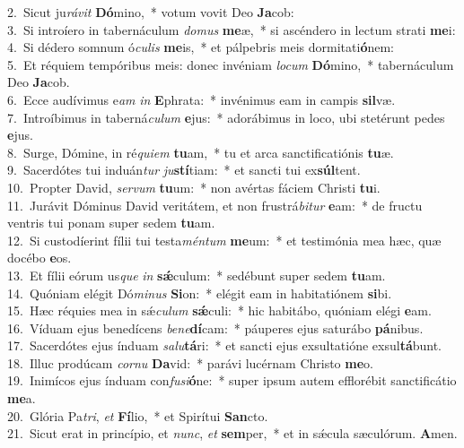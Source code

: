 {2.~}Sicut ju\textit{rá}\textit{vit} \textbf{Dó}mino,~* votum vovit Deo \textbf{Ja}cob:\\
{3.~}Si introíero in tabernáculum \textit{do}\textit{mus} \textbf{me}æ,~* si ascéndero in lectum strati \textbf{me}i:\\
{4.~}Si dédero somnum ó\textit{cu}\textit{lis} \textbf{me}is,~* et pálpebris meis dormitati\textbf{ó}nem:\\
{5.~}Et réquiem tempóribus meis: donec invéniam \textit{lo}\textit{cum} \textbf{Dó}mino,~* tabernáculum Deo \textbf{Ja}cob.\\
{6.~}Ecce audívimus e\textit{am} \textit{in} \textbf{E}phrata:~* invénimus eam in campis \textbf{sil}væ.\\
{7.~}Introíbimus in taberná\textit{cu}\textit{lum} \textbf{e}jus:~* adorábimus in loco, ubi stetérunt pedes \textbf{e}jus.\\
{8.~}Surge, Dómine, in ré\textit{qui}\textit{em} \textbf{tu}am,~* tu et arca sanctificatiónis \textbf{tu}æ.\\
{9.~}Sacerdótes tui induán\textit{tur} \textit{ju}\textbf{stí}tiam:~* et sancti tui ex\textbf{súl}tent.\\
{10.~}Propter David, \textit{ser}\textit{vum} \textbf{tu}um:~* non avértas fáciem Christi \textbf{tu}i.\\
{11.~}Jurávit Dóminus David veritátem, et non frustrá\textit{bi}\textit{tur} \textbf{e}am:~* de fructu ventris tui ponam super sedem \textbf{tu}am.\\
{12.~}Si custodíerint fílii tui testa\textit{mén}\textit{tum} \textbf{me}um:~* et testimónia mea hæc, quæ docébo \textbf{e}os.\\
{13.~}Et fílii eórum us\textit{que} \textit{in} \textbf{sǽ}culum:~* sedébunt super sedem \textbf{tu}am.\\
{14.~}Quóniam elégit Dó\textit{mi}\textit{nus} \textbf{Si}on:~* elégit eam in habitatiónem \textbf{si}bi.\\
{15.~}Hæc réquies mea in sǽ\textit{cu}\textit{lum} \textbf{sǽ}culi:~* hic habitábo, quóniam elégi \textbf{e}am.\\
{16.~}Víduam ejus benedícens \textit{be}\textit{ne}\textbf{dí}cam:~* páuperes ejus saturábo \textbf{pá}nibus.\\
{17.~}Sacerdótes ejus índuam \textit{sa}\textit{lu}\textbf{tá}ri:~* et sancti ejus exsultatióne exsul\textbf{tá}bunt.\\
{18.~}Illuc prodúcam \textit{cor}\textit{nu} \textbf{Da}vid:~* parávi lucérnam Christo \textbf{me}o.\\
{19.~}Inimícos ejus índuam con\textit{fu}\textit{si}\textbf{ó}ne:~* super ipsum autem efflorébit sanctificátio \textbf{me}a.\\
{20.~}Glória Pa\textit{tri}, \textit{et} \textbf{Fí}lio,~* et Spirítui \textbf{San}cto.\\
{21.~}Sicut erat in princípio, et \textit{nunc}, \textit{et} \textbf{sem}per,~* et in sǽcula sæculórum. \textbf{A}men.\\
